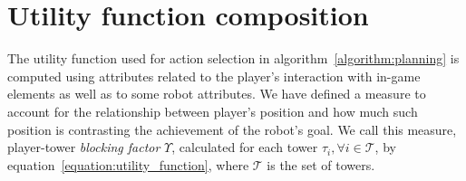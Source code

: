 \section{Utility function composition}\label{section:planning_features}
The utility function used for action selection in algorithm~\ref{algorithm:planning} is computed using attributes related to the player's interaction with in-game elements as well as to some robot attributes. We have defined a measure to account for the relationship between player's position and how much such position is contrasting the achievement of the robot's goal.
We call this measure, player-tower \textit{blocking factor} $\Upsilon$, calculated for each tower  $\tau_{i},\forall i \in \mathcal{T}$, by equation~\ref{equation:utility_function}, where $\mathcal{T}$ is the set of towers. 

